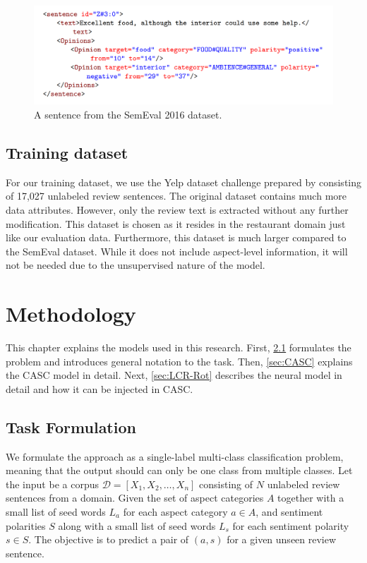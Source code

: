 \documentclass[american, oneside]{ecsgdp}
\begin{document}
\begin{figure}[htbp]
    \centering
    \includegraphics[width=\textwidth]{example_semeval.PNG}
    \caption{A sentence from the SemEval 2016 dataset.}
    \label{fig:example_semeval}
\end{figure}

\section{Training dataset} \label{sec:training}
For our training dataset, we use the Yelp dataset challenge prepared by \textcite{Huang2020JASen} consisting of 17,027 unlabeled review sentences. The original dataset \parencite{Tang2016Yelp} contains much more data attributes. However, only the review text is extracted without any further modification. This dataset is chosen as it resides in the restaurant domain just like our evaluation data. Furthermore, this dataset is much larger compared to the SemEval dataset. While it does not include aspect-level information, it will not be needed due to the unsupervised nature of the model.

\chapter{Methodology} \label{chap:methodology}

This chapter explains the models used in this research. First, \cref{sec:formulation} formulates the problem and introduces general notation to the task. Then, \cref{sec:CASC} explains the CASC model in detail. Next, \cref{sec:LCR-Rot} describes the neural model in detail and how it can be injected in CASC.

\section{Task Formulation} \label{sec:formulation}
We formulate the approach as a single-label multi-class classification problem, meaning that the output should can only be one class from multiple classes. Let the input be a corpus $\mathcal{D} = [X_1, X_2, \dots, X_n]$ consisting of $N$ unlabeled review sentences from a domain. Given the set of aspect categories $A$ together with a small list of seed words $L_a$ for each aspect category $a \in A$, and sentiment polarities $S$ along with a small list of seed words $L_s$ for each sentiment polarity $s \in S$. The objective is to predict a pair of $(a, s)$ for a given unseen review sentence.
\end{document}
